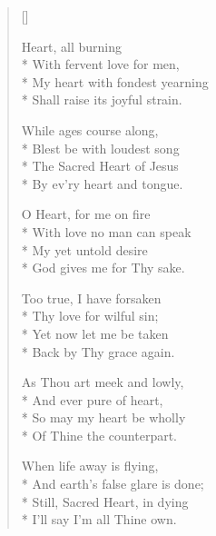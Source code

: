 \newHymn
{}

\begin{verse}[\versewidth]

\begin{altverse}
  Heart, all burning\\*
With fervent love for men,         \\*
My heart with fondest yearning     \\*
Shall raise its joyful strain.       
\end{altverse}

\begin{indentedVerse}
\begin{altverse}
 \vin While ages course along,           \\*
\vin Blest be with loudest song         \\*
\vin The Sacred Heart of Jesus          \\*
\vin By ev'ry heart and tongue. 
\end{altverse}
\end{indentedVerse}

\begin{altverse}
 O Heart, for me on fire         \\*
With love no man can speak         \\*
My yet untold desire               \\*
God gives me for Thy sake.         
\end{altverse}

\begin{altverse}
 Too true, I have forsaken       \\*
Thy love for wilful sin;           \\*
Yet now let me be taken            \\*
Back by Thy grace again.           
\end{altverse}

\begin{altverse}                                   
 As Thou art meek and lowly,     \\*
And ever pure of heart,            \\*
So may my heart be wholly          \\*
Of Thine the counterpart.          
\end{altverse}

\begin{altverse}                                   
 When life away is flying,       \\*
And earth's false glare is done;   \\*
Still, Sacred Heart, in dying      \\*
I'll say I'm all Thine own.        
\end{altverse}
\end{verse}

